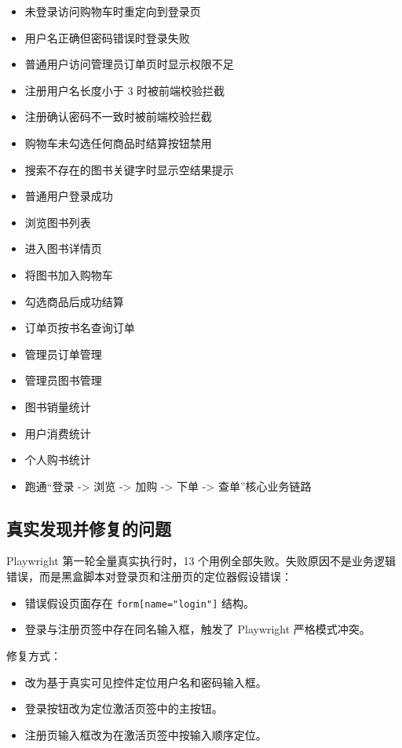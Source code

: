 \documentclass[UTF8,a4paper,12pt]{ctexart}
\begin{document}
\begin{itemize}
  \item 未登录访问购物车时重定向到登录页
  \item 用户名正确但密码错误时登录失败
  \item 普通用户访问管理员订单页时显示权限不足
  \item 注册用户名长度小于 3 时被前端校验拦截
  \item 注册确认密码不一致时被前端校验拦截
  \item 购物车未勾选任何商品时结算按钮禁用
  \item 搜索不存在的图书关键字时显示空结果提示
  \item 普通用户登录成功
  \item 浏览图书列表
  \item 进入图书详情页
  \item 将图书加入购物车
  \item 勾选商品后成功结算
  \item 订单页按书名查询订单
  \item 管理员订单管理
  \item 管理员图书管理
  \item 图书销量统计
  \item 用户消费统计
  \item 个人购书统计
  \item 跑通“登录 -> 浏览 -> 加购 -> 下单 -> 查单”核心业务链路
\end{itemize}

\subsection{真实发现并修复的问题}

Playwright 第一轮全量真实执行时，13 个用例全部失败。失败原因不是业务逻辑错误，而是黑盒脚本对登录页和注册页的定位器假设错误：

\begin{itemize}
  \item 错误假设页面存在 \texttt{form[name="login"]} 结构。
  \item 登录与注册页签中存在同名输入框，触发了 Playwright 严格模式冲突。
\end{itemize}

修复方式：

\begin{itemize}
  \item 改为基于真实可见控件定位用户名和密码输入框。
  \item 登录按钮改为定位激活页签中的主按钮。
  \item 注册页输入框改为在激活页签中按输入顺序定位。
\end{itemize}
\end{document}
